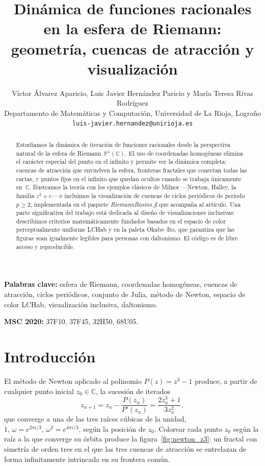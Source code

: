 \documentclass[11pt,a4paper]{article}
\title{\textbf{Dinámica de funciones racionales en la esfera de Riemann:
       geometría, cuencas de atracción y visualización}}
\author{Víctor Álvarez Aparicio,
        Luis Javier Hernández Paricio
        y María Teresa Rivas Rodríguez\\
        {\small Departamento de Matemáticas y Computación,
        Universidad de La Rioja, Logroño}\\
        {\small \texttt{luis-javier.hernandez@unirioja.es}}}
\date{} %
\theoremstyle{plain}
\theoremstyle{definition}
\theoremstyle{remark}
\newcommand{\C}{\mathbb{C}}
\newcommand{\Puno}{\mathbb{P}^1(\mathbb{C})}
\newcommand{\pkg}[1]{\textsl{#1}}
\begin{document}

\maketitle

\begin{abstract}
Estudiamos la dinámica de iteración de funciones racionales desde la
perspectiva natural de la esfera de Riemann~$\Puno$.
El uso de coordenadas homogéneas elimina el carácter especial del punto
en el infinito y permite ver la dinámica completa: cuencas de atracción
que envuelven la esfera, fronteras fractales que conectan todas las
cartas, y puntos fijos en el infinito que quedan ocultos cuando se
trabaja únicamente en~$\C$.
Ilustramos la teoría con los ejemplos clásicos de Milnor —Newton,
Halley, la familia $z^2+c$— e incluimos la visualización de cuencas
de ciclos periódicos de período~$p\geq 2$, implementada en el paquete
\pkg{RiemannBasins.jl} que acompaña al artículo.
Una parte significativa del trabajo está dedicada al diseño de
visualizaciones inclusivas: describimos criterios matemáticamente
fundados basados en el espacio de color perceptualmente uniforme LCHab
y en la paleta Okabe--Ito, que garantiza que las figuras sean
igualmente legibles para personas con daltonismo.
El código es de libre acceso y reproducible.
\end{abstract}

\bigskip
\noindent\textbf{Palabras clave:} esfera de Riemann, coordenadas homogéneas,
cuencas de atracción, ciclos periódicos, conjunto de Julia, método de Newton,
espacio de color LCHab, visualización inclusiva, daltonismo.

\medskip
\noindent\textbf{MSC 2020:} 37F10, 37F45, 32H50, 68U05.

\section{Introducción}

El método de Newton aplicado al polinomio $P(z)=z^3-1$ produce, a partir
de cualquier punto inicial $z_0\in\C$, la sucesión de iterados
\[
   z_{n+1} = z_n - \frac{P(z_n)}{P'(z_n)}
           = \frac{2z_n^3+1}{3z_n^2},
\]
que converge a una de las tres raíces cúbicas de la unidad,
$1,\,\omega=e^{2\pi i/3},\,\omega^2=e^{4\pi i/3}$, según la posición de
$z_0$.
Colorear cada punto $z_0$ según la raíz a la que converge su órbita
produce la figura~\ref{fig:newton_z3}: un fractal con simetría de orden
tres en el que las tres cuencas de atracción se entrelazan de forma
infinitamente intrincada en su frontera común.
\end{document}
